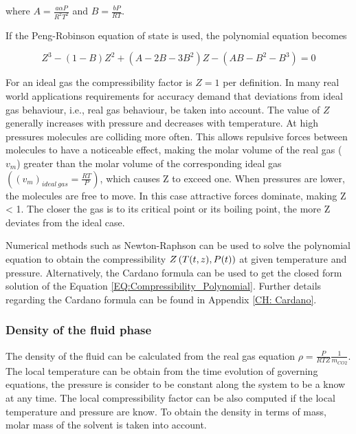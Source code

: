 \documentclass[../Article_Model_Parameters.tex]{subfiles}
\begin{document}
	where $A=\frac{a\alpha P}{R^2T^2}$ and $B=\frac{bP}{RT}$.
	
	If the Peng-Robinson equation of state \citet{Peng1976} is used, the polynomial equation becomes
	
	{\footnotesize
	\begin{equation}
		\label{EQ:Peng_Robinson_Polynomial}
		Z^3 - (1-B)Z^2+(A-2B-3B^2)Z -(AB-B^2-B^3) = 0
	\end{equation} }
	
	For an ideal gas the compressibility factor is $Z = 1$ per definition. In many real world applications requirements for accuracy demand that deviations from ideal gas behaviour, i.e., real gas behaviour, be taken into account. The value of $Z$ generally increases with pressure and decreases with temperature. At high pressures molecules are colliding more often. This allows repulsive forces between molecules to have a noticeable effect, making the molar volume of the real gas ($v_m$) greater than the molar volume of the corresponding ideal gas $\left( \left(v_m\right)_{ideal~gas} = \frac{RT}{P} \right)$, which causes Z to exceed one. When pressures are lower, the molecules are free to move. In this case attractive forces dominate, making Z < 1. The closer the gas is to its critical point or its boiling point, the more Z deviates from the ideal case. 
	
	Numerical methods such as Newton-Raphson can be used to solve the polynomial equation to obtain the compressibility ${\color{black}Z}\left({\color{black}T}(t,z), {\color{black}P}(t)\right)$ at given temperature and pressure. Alternatively, the Cardano formula can be used to get the closed form solution of the Equation \ref{EQ:Compressibility_Polynomial}. Further details regarding the Cardano formula can be found in Appendix \ref{CH: Cardano}.
	
	\subsubsection{Density of the fluid phase} \label{subsubsec: Fluid density}
	
	The density of the fluid can be calculated from the real gas equation $\rho = \frac{P}{RTZ} \frac{1}{m_{CO2}}$. The local temperature can be obtain from the time evolution of governing equations, the pressure is consider to be constant along the system to be a know at any time. The local compressibility factor can be also computed if the local temperature and pressure are know. To obtain the density in terms of mass, molar mass of the solvent is taken into account.
	
\end{document}
